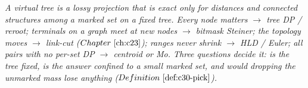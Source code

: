 \begin{recallbox}
\emph{A virtual tree is a lossy projection that is exact only for distances and connected
structures among a marked set on a fixed tree. Every node matters \(\to\) tree DP /
reroot; terminals on a graph meet at new nodes \(\to\) bitmask Steiner; the topology
moves \(\to\) link-cut (\(\chref{c23}\)); ranges never shrink \(\to\) HLD / Euler; all
pairs with no per-set DP \(\to\) centroid or Mo. Three questions decide it: is the tree
fixed, is the answer confined to a small marked set, and would dropping the unmarked
mass lose anything (\(\defref{c30-pick}\)).}
\end{recallbox}

